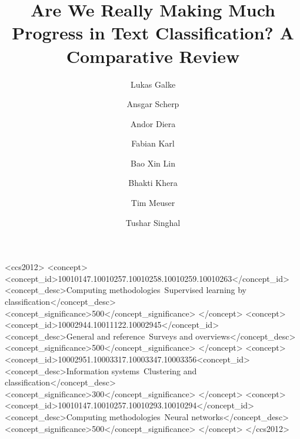 \documentclass[acmsmall,nonacm]{acmart}
\begin{document}
\title{Are We Really Making Much Progress in Text Classification? A Comparative Review}


\author{Lukas Galke}

\author{Ansgar Scherp}

\author{Andor Diera}

\author{Fabian Karl}

\author{Bao Xin Lin}

\author{Bhakti Khera}

\author{Tim Meuser}

\author{Tushar Singhal}

\begin{CCSXML}
<ccs2012>
   <concept>
       <concept_id>10010147.10010257.10010258.10010259.10010263</concept_id>
       <concept_desc>Computing methodologies~Supervised learning by classification</concept_desc>
       <concept_significance>500</concept_significance>
       </concept>
   <concept>
       <concept_id>10002944.10011122.10002945</concept_id>
       <concept_desc>General and reference~Surveys and overviews</concept_desc>
       <concept_significance>500</concept_significance>
       </concept>
   <concept>
       <concept_id>10002951.10003317.10003347.10003356<concept_id>
       <concept_desc>Information systems~Clustering and classification</concept_desc>
       <concept_significance>300</concept_significance>
       </concept>
   <concept>
       <concept_id>10010147.10010257.10010293.10010294</concept_id>
       <concept_desc>Computing methodologies~Neural networks</concept_desc>
       <concept_significance>500</concept_significance>
       </concept>
 </ccs2012>
\end{CCSXML}
\end{document}

